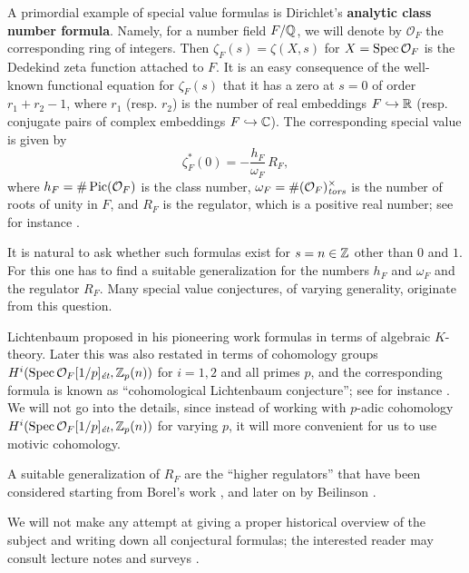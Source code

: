 \documentclass{article}
\numberwithin{equation}{section}
\begin{document}
A primordial example of special value formulas is Dirichlet's
\textbf{analytic class number formula}. Namely, for a number field $F/\QQ$, we
will denote by $\mathcal{O}_F$ the corresponding ring of integers. Then
$\zeta_F (s) = \zeta (X,s)$ for $X = \Spec \mathcal{O}_F$ is the Dedekind zeta
function attached to $F$.  It is an easy consequence of the well-known
functional equation for $\zeta_F (s)$ that it has a zero at $s = 0$ of order
$r_1 + r_2 - 1$, where $r_1$ (resp. $r_2$) is the number of real embeddings
$F \hookrightarrow \RR$ (resp. conjugate pairs of complex embeddings
$F \hookrightarrow \CC$). The corresponding special value is given by
\begin{equation}
  \label{eqn:zeta-F-at-s=0}
  \zeta^*_F (0) = -\frac{h_F}{\omega_F}\,R_F,
\end{equation}
where $h_F = \# \Pic (\mathcal{O}_F)$ is the class number,
$\omega_F = \# (\mathcal{O}_F)^\times_\tors$ is the number of roots of unity in
$F$, and $R_F$ is the regulator, which is a positive real number;
see for instance \cite[\S VII.5]{Neukirch-1999}.

It is natural to ask whether such formulas exist for $s = n \in \ZZ$ other than
$0$ and $1$. For this one has to find a suitable generalization for the numbers
$h_F$ and $\omega_F$ and the regulator $R_F$. Many special value conjectures, of
varying generality, originate from this question.

Lichtenbaum proposed in his pioneering work \cite{Lichtenbaum-1973} formulas in
terms of algebraic $K$-theory. Later this was also restated in terms of
cohomology groups $H^i (\Spec \mathcal{O}_F [1/p]_\et, \ZZ_p (n))$
for $i = 1,2$ and all primes $p$, and the corresponding formula is known as
``cohomological Lichtenbaum conjecture''; see for instance
\cite{Huber-Kings-2003}. We will not go into the details, since instead of
working with $p$-adic cohomology
$H^i (\Spec \mathcal{O}_F [1/p]_\et, \ZZ_p (n))$ for varying $p$, it will more
convenient for us to use motivic cohomology.

A suitable generalization of $R_F$ are the ``higher regulators'' that have been
considered starting from Borel's work \cite{Borel-1977}, and later on by
Beilinson \cite{Beilinson-1984}.

We will not make any attempt at giving a proper historical overview of the
subject and writing down all conjectural formulas; the interested reader may
consult lecture notes \cite{Kolster-2004} and surveys
\cite{Goncharov-2005,Kahn-2005}.
\end{document}
